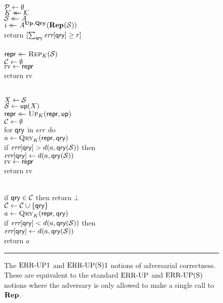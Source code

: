 \begin{figure}[t]
  {
     \\[2pt]
      $\setP \gets \emptyset$\\
      $\key \getsr \keys$\\
      $\col \getsr \advA$\\
      $i \getsr \advA^{\UPO,\QRYO}(\REPO(\col))$\\
      return $[\sum_\qry \err[\qry] \geq r]$ 
    \\[6pt]
    \oraclev{$\REPO(\col)$}\\[2pt]
      $\pub \getsr \Rep_\key(\col)$\\
      $\setC \gets \emptyset$\\
      $\mathrm{rv} \gets \pub$  \\
      return $\mathrm{rv}$
  }
  {
    \oraclev{$\UPO(\up)$}\\[2pt]
      $X \gets \col$ \\
      $\col \gets \up(X)$\\
      $\pub \getsr \Up_\key(\pub, \up)$\\
      $\setC \gets \emptyset$\\
      for $\qry$ in $\err$ do\\
      \tab $a \gets \Qry_K(\pub, \qry)$\\
      \tab if $\err[\qry] > d(a,\qry(\col))$ then\\
      \tab\tab$\err[\qry] \gets d(a,\qry(\col))$\\
      $\mathrm{rv} \gets \pub$ \\
      return $\mathrm{rv}$
      \medskip

    \oraclev{$\QRYO(\qry)$}\\[2pt]
      if $\qry \in \setC$ then return $\bot$\\
      $\setC \gets \setC \union \{\qry\}$\\
      $a \gets \Qry_K(\pub, \qry)$\\
      if $\err[\qry] < d(a,\qry(\col))$ then\\
      \tab$\err[\qry] \gets d(a,\qry(\col))$\\
      return $a$
  }
  \caption{The $\errep1$ and $\erreps1$ notions of adversarial correctness. These are equivalent to the standard $\errep$ and $\erreps$ notions where the adversary is only allowed to make a single call to $\REPO$.}
  \vspace{6pt}\hrule
  \label{fig:security}
\end{figure}